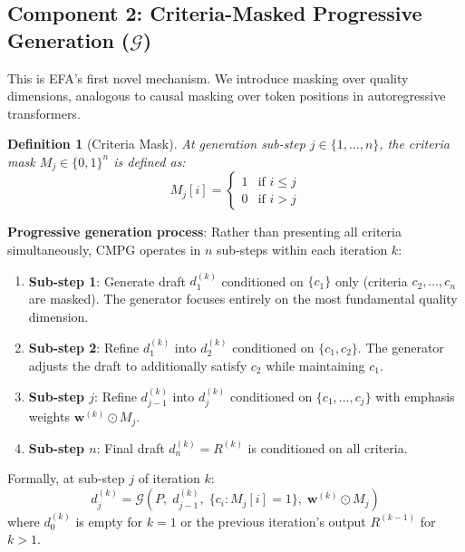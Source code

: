 \documentclass[11pt]{article}
\newtheorem{definition}{Definition}
\newcommand{\efa}{\textsc{EFA}}  %
\newcommand{\cmpg}{\textsc{CMPG}}
\newcommand{\calG}{\mathcal{G}}
\begin{document}
\subsection{Component 2: Criteria-Masked Progressive Generation ($\calG$)}
\label{sec:cmpg}

This is \efa{}'s first novel mechanism. We introduce masking over quality dimensions, analogous to causal masking over token positions in autoregressive transformers.

\begin{definition}[Criteria Mask]
At generation sub-step $j \in \{1, \ldots, n\}$, the criteria mask $M_j \in \{0, 1\}^n$ is defined as:
\begin{equation}
    M_j[i] = \begin{cases} 1 & \text{if } i \leq j \\ 0 & \text{if } i > j \end{cases}
\end{equation}
\end{definition}

\textbf{Progressive generation process}: Rather than presenting all criteria simultaneously, \cmpg{} operates in $n$ sub-steps within each iteration $k$:

\begin{enumerate}[leftmargin=*]
    \item \textbf{Sub-step 1}: Generate draft $d_1^{(k)}$ conditioned on $\{c_1\}$ only (criteria $c_2, \ldots, c_n$ are masked). The generator focuses entirely on the most fundamental quality dimension.
    \item \textbf{Sub-step 2}: Refine $d_1^{(k)}$ into $d_2^{(k)}$ conditioned on $\{c_1, c_2\}$. The generator adjusts the draft to additionally satisfy $c_2$ while maintaining $c_1$.
    \item \textbf{Sub-step $j$}: Refine $d_{j-1}^{(k)}$ into $d_j^{(k)}$ conditioned on $\{c_1, \ldots, c_j\}$ with emphasis weights $\mathbf{w}^{(k)} \odot M_j$.
    \item \textbf{Sub-step $n$}: Final draft $d_n^{(k)} = R^{(k)}$ is conditioned on all criteria.
\end{enumerate}

Formally, at sub-step $j$ of iteration $k$:
\begin{equation}
    d_j^{(k)} = \calG\left(P, \; d_{j-1}^{(k)}, \; \{c_i : M_j[i] = 1\}, \; \mathbf{w}^{(k)} \odot M_j \right)
\end{equation}
where $d_0^{(k)}$ is empty for $k=1$ or the previous iteration's output $R^{(k-1)}$ for $k > 1$.
\end{document}
